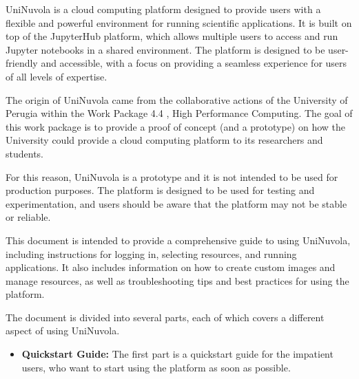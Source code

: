 UniNuvola is a cloud computing platform designed to provide users with a flexible and powerful environment for running scientific applications.
It is built on top of the JupyterHub platform, which allows multiple users to access and run Jupyter notebooks in a shared environment.
The platform is designed to be user-friendly and accessible, with a focus on providing a seamless experience for users of all levels of expertise.

The origin of UniNuvola came from the collaborative actions of the University of Perugia within the Work Package 4.4 , High Performance Computing.
The goal of this work package is to provide a proof of concept (and a prototype) on how the University could provide a cloud computing platform to its researchers and students.

For this reason, UniNuvola is a prototype and it is not intended to be used for production purposes. The platform is designed to be used for testing and experimentation, and users should be aware that the platform may not be stable or reliable.

This document is intended to provide a comprehensive guide to using UniNuvola, including instructions for logging in, selecting resources, and running applications.
It also includes information on how to create custom images and manage resources, as well as troubleshooting tips and best practices for using the platform.

The document is divided into several parts, each of which covers a different aspect of using UniNuvola.

\begin{itemize}
	\item \textbf{Quickstart Guide:} The first part is a quickstart guide for the impatient users, who want to start using the platform as soon as possible.
\end{itemize}
 
 





